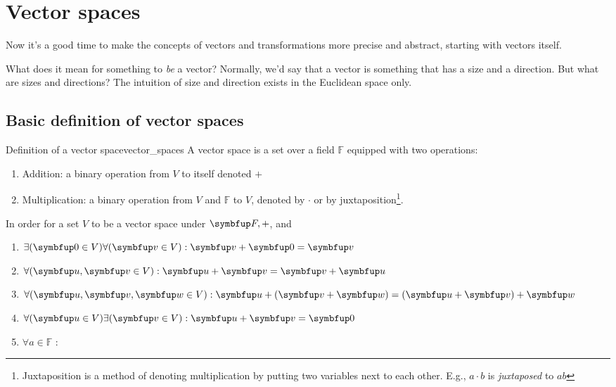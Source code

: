 \chapter{Vector spaces}

Now it's a good time to make the concepts of vectors and transformations more precise and abstract, starting with vectors itself.

What does it mean for something to \emph{be} a vector? Normally, we'd say that a vector is something that has a size and a direction. But what are sizes and directions? The intuition of size and direction exists in the Euclidean space only.

\section{Basic definition of vector spaces}

\begin{df}{Definition of a vector space}{vector_spaces}
  A vector space is a set over a field \(\mathbb{F}\) equipped with two operations:
  \begin{enumerate}
    \item Addition: a binary operation from \(V\) to itself denoted \(+\)
    \item Multiplication: a binary operation from \(V\) and \(\mathbb{F}\) to \(V\), denoted by \(\cdot\) or by juxtaposition\footnote{Juxtaposition is a method of denoting multiplication by putting two variables next to each other. E.g., \(a \cdot b\) is \emph{juxtaposed} to \(ab\)}.
  \end{enumerate}
  In order for a set \(V\) to be a vector space under \(\vv{F}, +\), and
  \begin{enumerate}[noitemsep]
    \item \(\exists (\vv{0} \in V) \forall (\vv{v} \in V) : \vv{v} + \vv{0} = \vv{v}\)
    \item \(\forall (\vv{u}, \vv{v} \in V) : \vv{u} + \vv{v} = \vv{v} + \vv{u}\)
    \item \(\forall (\vv{u}, \vv{v}, \vv{w} \in V) : \vv{u} + (\vv{v} + \vv{w}) = (\vv{u} + \vv{v}) + \vv{w}\)
    \item \(\forall (\vv{u} \in V) \exists (\vv{v} \in V) : \vv{u} + \vv{v} = \vv{0}\)
    \item \(\forall a \in \mathbb{F}\) :
  \end{enumerate}
\end{df}


